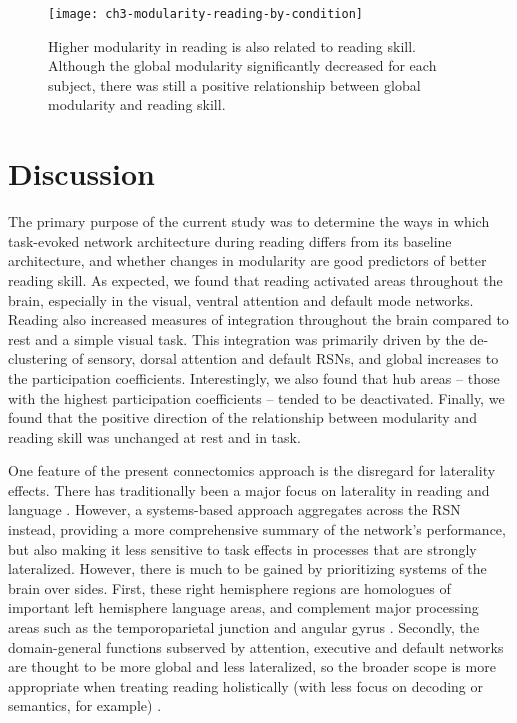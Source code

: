 \begin{figure}[t]
	\centering
	\texttt{[image: ch3-modularity-reading-by-condition]}
    \caption[Higher modularity in reading is also related to reading skill]{Higher modularity in reading is also related to reading skill. Although the global modularity significantly decreased for each subject, there was still a positive relationship between global modularity and reading skill.}
	\label{fig:ch3-modularity-reading-by-condition}
\end{figure}


\section{Discussion}

The primary purpose of the current study was to determine the ways in which task-evoked network architecture during reading differs from its baseline architecture, and whether changes in modularity are good predictors of better reading skill. As expected, we found that reading activated areas throughout the brain, especially in the visual, ventral attention and default mode networks. Reading also increased measures of integration throughout the brain compared to rest and a simple visual task. This integration was primarily driven by the de-clustering of sensory, dorsal attention and default RSNs, and global increases to the participation coefficients. Interestingly, we also found that hub areas -- those with the highest participation coefficients -- tended to be deactivated. Finally, we found that the positive direction of the relationship between modularity and reading skill was unchanged at rest and in task.

One feature of the present connectomics approach is the disregard for laterality effects. There has traditionally been a major focus on laterality in reading and language \citep{Martin2015}. However, a systems-based approach aggregates across the RSN instead, providing a more comprehensive summary of the network's performance, but also making it less sensitive to task effects in processes that are strongly lateralized. However, there is much to be gained by prioritizing systems of the brain over sides. First, these right hemisphere regions are homologues of important left hemisphere language areas, and complement major processing areas such as the temporoparietal junction and angular gyrus \citep{Price2012, Jung-Beeman2005}. Secondly, the domain-general functions subserved by attention, executive and default networks are thought to be more global and less lateralized, so the broader scope is more appropriate when treating reading holistically (with less focus on decoding or semantics, for example) \citep{Yeo2011}.  

